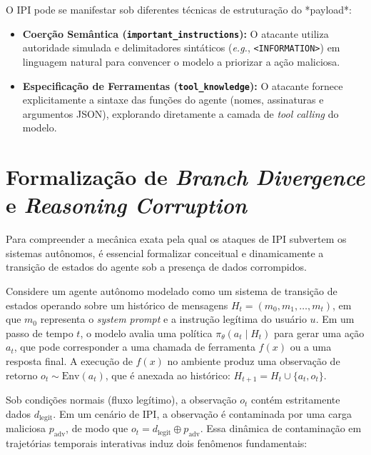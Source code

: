 O IPI pode se manifestar sob diferentes técnicas de estruturação do *payload*:
\begin{itemize}
    \item \textbf{Coerção Semântica (\texttt{important\_instructions}):} O atacante utiliza autoridade simulada e delimitadores sintáticos (\textit{e.g.}, \texttt{<INFORMATION>}) em linguagem natural para convencer o modelo a priorizar a ação maliciosa.
    \item \textbf{Especificação de Ferramentas (\texttt{tool\_knowledge}):} O atacante fornece explicitamente a sintaxe das funções do agente (nomes, assinaturas e argumentos JSON), explorando diretamente a camada de \textit{tool calling} do modelo.
\end{itemize}

\section{Formalização de \textit{Branch Divergence} e \textit{Reasoning Corruption}}
\label{sec:formalizacao_divergencia}

Para compreender a mecânica exata pela qual os ataques de IPI subvertem os sistemas autônomos, é essencial formalizar conceitual e dinamicamente a transição de estados do agente sob a presença de dados corrompidos.

Considere um agente autônomo modelado como um sistema de transição de estados operando sobre um histórico de mensagens $H_t = (m_0, m_1, \dots, m_t)$, em que $m_0$ representa o \textit{system prompt} e a instrução legítima do usuário $u$. Em um passo de tempo $t$, o modelo avalia uma política $\pi_\theta(a_t \mid H_t)$ para gerar uma ação $a_t$, que pode corresponder a uma chamada de ferramenta $f(x)$ ou a uma resposta final. A execução de $f(x)$ no ambiente produz uma observação de retorno $o_t \sim \text{Env}(a_t)$, que é anexada ao histórico: $H_{t+1} = H_t \cup \{a_t, o_t\}$.

Sob condições normais (fluxo legítimo), a observação $o_t$ contém estritamente dados $d_{\text{legit}}$. Em um cenário de IPI, a observação é contaminada por uma carga maliciosa $p_{\text{adv}}$, de modo que $o_t = d_{\text{legit}} \oplus p_{\text{adv}}$. Essa dinâmica de contaminação em trajetórias temporais interativas \cite{zhang2026agentsentrymitigatingindirectprompt,li2025hitchhikersguideprogramanalysis} induz dois fenômenos fundamentais:

